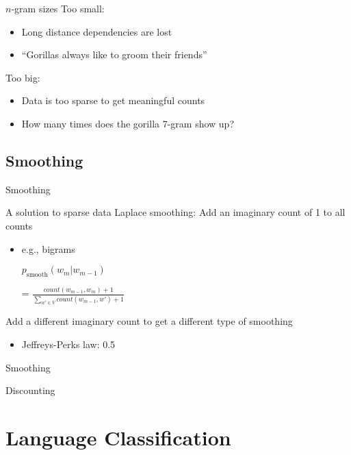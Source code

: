 \documentclass{beamer}
\begin{document}
      \begin{frame}{\subtwo}
        \begin{block}{$n$-gram sizes}
          Too small:
          \begin{itemize}
            \item Long distance dependencies are lost
            \item ``\alert{Gorillas} always like to groom \alert{their} friends''
          \end{itemize}
          Too big:
          \begin{itemize}
            \item Data is too sparse to get meaningful counts
            \item How many times does the gorilla 7-gram show up?
          \end{itemize}
        \end{block}
      \end{frame}

    \newcommand{\subthree}{Smoothing}
    \subsection{\subthree}
      \begin{frame}{\subthree}
        \begin{block}{A solution to sparse data}
          Laplace smoothing: Add an imaginary count of 1 to all counts
          \begin{itemize}
            \item e.g., bigrams
            \item[] $p_{\text{smooth}} ( w_m | w_{m-1} )$
            \item[=] $\frac{count ( w_{m-1}, w_m ) + 1}
                           {\sum_{w' \in V}{count ( w_{m-1}, w' ) + 1}}$
          \end{itemize}
        \end{block}

        \begin{block}{}
          Add a different imaginary count to get a different type of smoothing
          \begin{itemize}
            \item Jeffreys-Perks law: 0.5
          \end{itemize}
        \end{block}
      \end{frame}

      \begin{frame}{\subthree}
        \begin{block}{Discounting}
          
        \end{block}
      \end{frame}

  \section{Language Classification}
\end{document}
